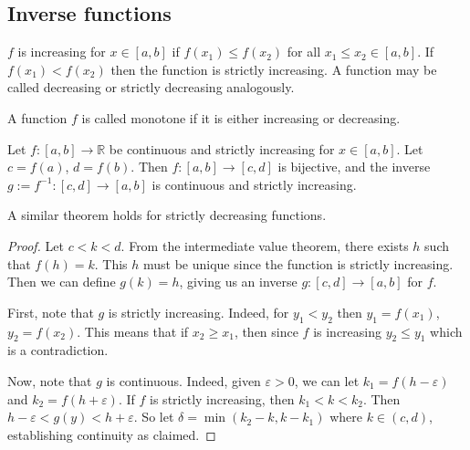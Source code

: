 \subsection{Inverse functions}
\begin{definition}
	\(f\) is increasing for \(x \in [a, b]\) if \(f(x_1) \leq f(x_2)\) for all \(x_1 \leq x_2 \in [a, b]\).
	If \(f(x_1) < f(x_2)\) then the function is strictly increasing.
	A function may be called decreasing or strictly decreasing analogously.
\end{definition}
\begin{definition}
	A function \(f\) is called monotone if it is either increasing or decreasing.
\end{definition}
\begin{theorem}
	Let \(f \colon [a, b] \to \mathbb R\) be continuous and strictly increasing for \(x \in [a, b]\).
	Let \(c = f(a)\), \(d = f(b)\).
	Then \(f \colon [a, b] \to [c, d]\) is bijective, and the inverse \(g := f^{-1} \colon [c, d] \to [a, b]\) is continuous and strictly increasing.
\end{theorem}
\noindent A similar theorem holds for strictly decreasing functions.
\begin{proof}
	Let \(c < k < d\).
	From the intermediate value theorem, there exists \(h\) such that \(f(h) = k\).
	This \(h\) must be unique since the function is strictly increasing.
	Then we can define \(g(k) = h\), giving us an inverse \(g \colon [c, d] \to [a, b]\) for \(f\).

	First, note that \(g\) is strictly increasing.
	Indeed, for \(y_1 < y_2\) then \(y_1 = f(x_1)\), \(y_2 = f(x_2)\).
	This means that if \(x_2 \geq x_1\), then since \(f\) is increasing \(y_2 \leq y_1\) which is a contradiction.

	Now, note that \(g\) is continuous.
	Indeed, given \(\varepsilon > 0\), we can let \(k_1 = f(h - \varepsilon)\) and \(k_2 = f(h + \varepsilon)\).
	If \(f\) is strictly increasing, then \(k_1 < k < k_2\).
	Then \(h - \varepsilon < g(y) < h + \varepsilon\).
	So let \(\delta = \min(k_2 - k, k - k_1)\) where \(k \in (c, d)\), establishing continuity as claimed.
\end{proof}
